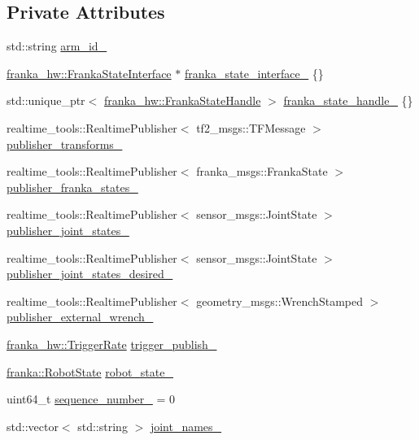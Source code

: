 \subsection*{Private Attributes}
\begin{DoxyCompactItemize}
\item 
std\+::string \hyperlink{classfranka__control_1_1FrankaStateController_a603d865facc13c7b1f2ebb5a27404221}{arm\+\_\+id\+\_\+}
\item 
\hyperlink{classfranka__hw_1_1FrankaStateInterface}{franka\+\_\+hw\+::\+Franka\+State\+Interface} $\ast$ \hyperlink{classfranka__control_1_1FrankaStateController_a3691177b860e7ea1bcaa323ccdfa86d0}{franka\+\_\+state\+\_\+interface\+\_\+} \{\}
\item 
std\+::unique\+\_\+ptr$<$ \hyperlink{classfranka__hw_1_1FrankaStateHandle}{franka\+\_\+hw\+::\+Franka\+State\+Handle} $>$ \hyperlink{classfranka__control_1_1FrankaStateController_a7f665b5f5fda44bcfa5f0703806d0048}{franka\+\_\+state\+\_\+handle\+\_\+} \{\}
\item 
realtime\+\_\+tools\+::\+Realtime\+Publisher$<$ tf2\+\_\+msgs\+::\+T\+F\+Message $>$ \hyperlink{classfranka__control_1_1FrankaStateController_a3466cae3276a7576686661ecbe05a649}{publisher\+\_\+transforms\+\_\+}
\item 
realtime\+\_\+tools\+::\+Realtime\+Publisher$<$ franka\+\_\+msgs\+::\+Franka\+State $>$ \hyperlink{classfranka__control_1_1FrankaStateController_a2ec0c84ee9474f84577a740360aae2e3}{publisher\+\_\+franka\+\_\+states\+\_\+}
\item 
realtime\+\_\+tools\+::\+Realtime\+Publisher$<$ sensor\+\_\+msgs\+::\+Joint\+State $>$ \hyperlink{classfranka__control_1_1FrankaStateController_a9cc0cb3e247d25ef305170666b48ec72}{publisher\+\_\+joint\+\_\+states\+\_\+}
\item 
realtime\+\_\+tools\+::\+Realtime\+Publisher$<$ sensor\+\_\+msgs\+::\+Joint\+State $>$ \hyperlink{classfranka__control_1_1FrankaStateController_aff239ebea490b911ac660c5b79f6308d}{publisher\+\_\+joint\+\_\+states\+\_\+desired\+\_\+}
\item 
realtime\+\_\+tools\+::\+Realtime\+Publisher$<$ geometry\+\_\+msgs\+::\+Wrench\+Stamped $>$ \hyperlink{classfranka__control_1_1FrankaStateController_aeff7a641817b5261934421fcbd1205f5}{publisher\+\_\+external\+\_\+wrench\+\_\+}
\item 
\hyperlink{classfranka__hw_1_1TriggerRate}{franka\+\_\+hw\+::\+Trigger\+Rate} \hyperlink{classfranka__control_1_1FrankaStateController_a1c903d6812d02a29796d64b0fc3eb51d}{trigger\+\_\+publish\+\_\+}
\item 
\hyperlink{structfranka_1_1RobotState}{franka\+::\+Robot\+State} \hyperlink{classfranka__control_1_1FrankaStateController_a0d097abb2665aadbc8d38662bba5ae8b}{robot\+\_\+state\+\_\+}
\item 
uint64\+\_\+t \hyperlink{classfranka__control_1_1FrankaStateController_ae36c62620e0099ce91976548bf51f240}{sequence\+\_\+number\+\_\+} = 0
\item 
std\+::vector$<$ std\+::string $>$ \hyperlink{classfranka__control_1_1FrankaStateController_afb6dc481c4d282d5f8f830f0cf943404}{joint\+\_\+names\+\_\+}
\end{DoxyCompactItemize}


